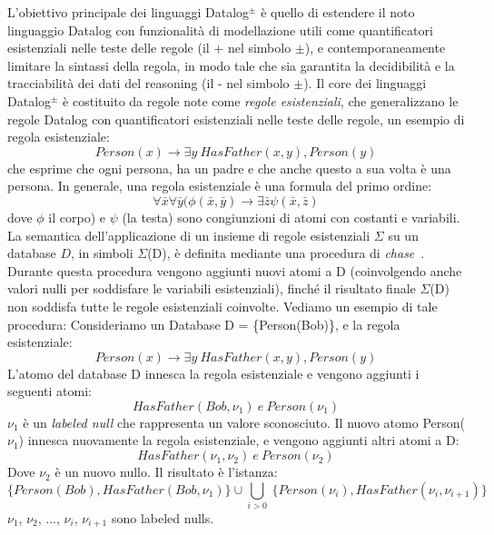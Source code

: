 L'obiettivo principale dei linguaggi Datalog$^\pm$ è quello di estendere il noto linguaggio Datalog con funzionalità di modellazione utili come quantificatori esistenziali nelle teste delle regole (il + nel simbolo $\pm $), e contemporaneamente limitare la sintassi della regola, in modo tale che sia garantita la decidibilità e la tracciabilità dei dati del reasoning (il - nel simbolo $\pm $). \newline
Il core dei linguaggi Datalog$^\pm $ è costituito da regole note come \emph{regole esistenziali}, che generalizzano le regole Datalog con quantificatori esistenziali nelle teste delle regole, un esempio di regola esistenziale: \[Person(x) \rightarrow \exists y ~HasFather(x,y), Person(y)\]
che esprime che ogni persona, ha un padre e che anche questo a sua volta è una persona. \newline
In generale, una regola esistenziale è una formula del primo ordine: \[\forall \bar{x} \forall \bar{y} (\phi(\bar{x}, \bar{y}) \rightarrow \exists \bar{z} \psi (\bar{x}, \bar{z})\]
dove $\phi$ il corpo) e $\psi$  (la testa) sono congiunzioni di atomi con costanti e variabili. \newline
La semantica dell'applicazione di un insieme di regole esistenziali $\Sigma$ su un database $D$, in simboli $\Sigma$(D), è definita mediante una procedura di \emph{chase}~\cite{fagin2005data}. Durante questa procedura vengono aggiunti nuovi atomi a D (coinvolgendo anche valori nulli per soddisfare le variabili esistenziali), finché il risultato finale $\Sigma$(D) non soddisfa tutte le regole esistenziali coinvolte. \newline
Vediamo un esempio di tale procedura: \newline
Consideriamo un Database D = \{Person(Bob)\}, e la regola esistenziale: \[Person(x) \rightarrow \exists y ~HasFather(x,y), Person(y)\]
L'atomo del database D innesca la regola esistenziale e vengono aggiunti i seguenti atomi: \[HasFather(Bob, \nu_{1}) ~e~ Person(\nu_{1})\]
$\nu_{1}$ è un \emph{labeled null} che rappresenta un valore sconosciuto.\newline
Il nuovo atomo Person($\nu_{1}$) innesca nuovamente la regola esistenziale, e vengono aggiunti altri atomi a D: \[HasFather(\nu_{1}, \nu_{2}) ~e~ Person(\nu_{2})\]
Dove $\nu_{2}$ è un nuovo nullo. Il risultato è l'istanza: \[\{Person(Bob), HasFather(Bob, \nu_{1})\} \cup \underset{i>0}{\bigcup} ~\{Person(\nu_{i}), HasFather(\nu_{i}, \nu_{i+1})\}\]
$\nu_{1}$, $\nu_{2}$, ..., $\nu_{i}$, $\nu_{i+1}$ sono labeled nulls. \newline \newline

